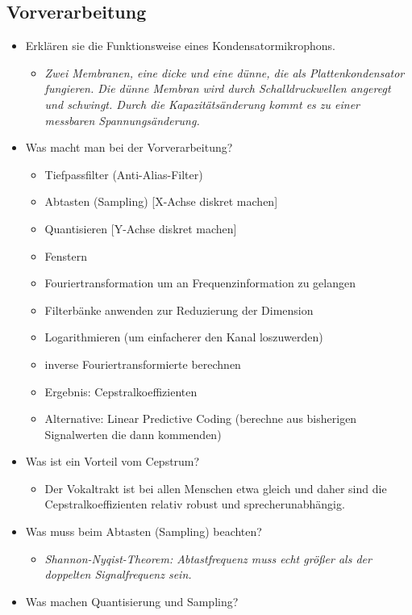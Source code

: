 \subsection{Vorverarbeitung}
\begin{itemize}
\item Erklären sie die Funktionsweise eines Kondensatormikrophons.
\begin{itemize}
\item \emph{Zwei Membranen, eine dicke und eine dünne, die als Plattenkondensator fungieren. Die dünne Membran wird durch Schalldruckwellen angeregt und schwingt. Durch die Kapazitätsänderung kommt es zu einer messbaren Spannungsänderung.}
\end{itemize}
\item Was macht man bei der Vorverarbeitung?
\begin{itemize}
\item Tiefpassfilter (Anti-Alias-Filter)
\item Abtasten (Sampling) [X-Achse diskret machen]
\item Quantisieren [Y-Achse diskret machen]
\item Fenstern
\item Fouriertransformation um an Frequenzinformation zu gelangen
\item Filterbänke anwenden zur Reduzierung der Dimension
\item Logarithmieren (um einfacherer den Kanal loszuwerden)
\item inverse Fouriertransformierte berechnen
\item Ergebnis: Cepstralkoeffizienten
\item Alternative: Linear Predictive Coding (berechne aus bisherigen Signalwerten die dann kommenden)
\end{itemize}
\item Was ist ein Vorteil vom Cepstrum? 
\begin{itemize}
\item Der Vokaltrakt ist bei allen Menschen etwa gleich und daher sind die Cepstralkoeffizienten relativ robust und sprecherunabhängig.
\end{itemize}
\item Was muss beim Abtasten (Sampling) beachten?
\begin{itemize}
\item \emph{Shannon-Nyqist-Theorem: Abtastfrequenz muss echt größer als der doppelten Signalfrequenz sein.}
\end{itemize}
\item Was machen Quantisierung und Sampling?

\end{itemize}
